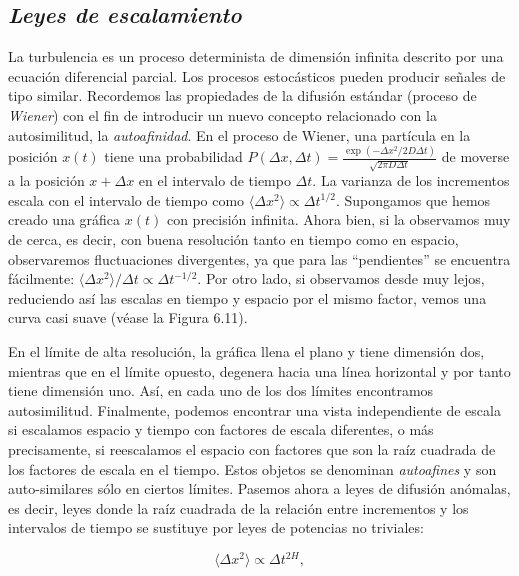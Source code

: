 \documentclass[10pt,a4paper]{book}
\begin{document}
\newpage

\subsection{\textit{Leyes de escalamiento}}

La turbulencia es un proceso determinista de dimensión infinita descrito por una ecuación diferencial parcial. Los procesos estocásticos pueden producir señales de tipo similar. Recordemos las propiedades de la difusión estándar (proceso de \textit{Wiener}) con el fin de introducir un nuevo concepto relacionado con la autosimilitud, la \textit{autoafinidad}. En el proceso de Wiener, una partícula en la posición \(x(t)\) tiene una probabilidad $P(\Delta x, \Delta t) = \frac{\exp(-\Delta x^2 / 2D\Delta t)}{\sqrt{2\pi D \Delta t}}$ de moverse a la posición \(x + \Delta x\) en el intervalo de tiempo \(\Delta t\). La varianza de los incrementos escala con el intervalo de tiempo como $\langle \Delta x^2 \rangle \propto \Delta t^{1/2}.$ Supongamos que hemos creado una gráfica \(x(t)\) con precisión infinita. Ahora bien, si la observamos muy de cerca, es decir, con buena resolución tanto en tiempo como en espacio, observaremos fluctuaciones divergentes, ya que para las “pendientes” se encuentra fácilmente: $\langle \Delta x^2 \rangle / \Delta t \propto \Delta t^{-1/2}.$ Por otro lado, si observamos desde muy lejos, reduciendo así las escalas en tiempo y espacio por el mismo factor, vemos una curva casi suave (véase la Figura 6.11).

\bigskip

En el límite de alta resolución, la gráfica llena el plano y tiene dimensión dos, mientras que en el límite opuesto, degenera hacia una línea horizontal y por tanto tiene dimensión uno. Así, en cada uno de los dos límites encontramos autosimilitud. Finalmente, podemos encontrar una vista independiente de escala si escalamos espacio y tiempo con factores de escala diferentes, o más precisamente, si reescalamos el espacio con factores que son la raíz cuadrada de los factores de escala en el tiempo. Estos objetos se denominan \textit{autoafines} y son auto-similares sólo en ciertos límites. Pasemos ahora a leyes de difusión anómalas, es decir, leyes donde la raíz cuadrada de la relación entre incrementos y los intervalos de tiempo se sustituye por leyes de potencias no triviales:

\begin{equation}
\langle \Delta x^2 \rangle \propto \Delta t^{2H},
\end{equation}
\end{document}

